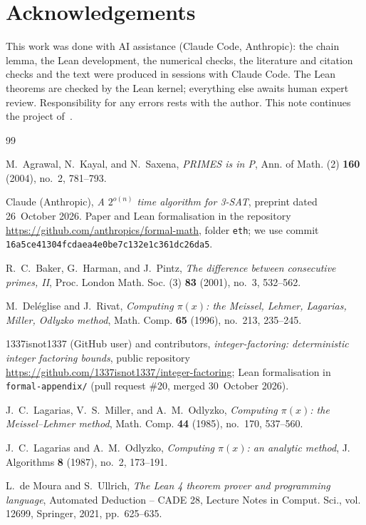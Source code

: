 \documentclass[10pt]{amsart}
\theoremstyle{plain}
\theoremstyle{definition}
\theoremstyle{remark}
\numberwithin{equation}{section}
\begin{document}
\section*{Acknowledgements}
This work was done with AI assistance (Claude Code, Anthropic): the chain lemma, the Lean development,
the numerical checks, the literature and citation checks and the text were produced in sessions with
Claude Code. The Lean theorems are checked by the Lean kernel; everything else awaits human expert
review. Responsibility for any errors rests with the author. This note continues the project
of~\cite{Tul26,TulFac26,TulCN26}.

\begin{thebibliography}{99}

M.~Agrawal, N.~Kayal, and N.~Saxena, \emph{{PRIMES} is in {P}}, Ann. of Math. (2) \textbf{160} (2004),
no.~2, 781--793.

Claude (Anthropic), \emph{A $2^{o(n)}$ time algorithm for {3-SAT}}, preprint dated 26~October 2026.
Paper and Lean formalisation in the repository \url{https://github.com/anthropics/formal-math}, folder
\texttt{eth}; we use commit \texttt{16a5ce41304fcdaea4e0be7c132e1c361dc26da5}.

R.~C.~Baker, G.~Harman, and J.~Pintz, \emph{The difference between consecutive primes, {II}}, Proc.
London Math. Soc. (3) \textbf{83} (2001), no.~3, 532--562.

M.~Del\'eglise and J.~Rivat, \emph{Computing $\pi(x)$: the {M}eissel, {L}ehmer, {L}agarias, {M}iller,
{O}dlyzko method}, Math. Comp. \textbf{65} (1996), no.~213, 235--245.

1337isnot1337 (GitHub user) and contributors, \emph{integer-factoring: deterministic integer factoring
bounds}, public repository \url{https://github.com/1337isnot1337/integer-factoring}; Lean formalisation in
\texttt{formal-appendix/} (pull request \#20, merged 30~October 2026).

J.~C.~Lagarias, V.~S.~Miller, and A.~M.~Odlyzko, \emph{Computing $\pi(x)$: the {M}eissel--{L}ehmer
method}, Math. Comp. \textbf{44} (1985), no.~170, 537--560.

J.~C.~Lagarias and A.~M.~Odlyzko, \emph{Computing $\pi(x)$: an analytic method}, J. Algorithms
\textbf{8} (1987), no.~2, 173--191.

L.~de Moura and S.~Ullrich, \emph{The {L}ean 4 theorem prover and programming language}, Automated
Deduction -- CADE 28, Lecture Notes in Comput. Sci., vol. 12699, Springer, 2021, pp.~625--635.


\end{thebibliography}
\end{document}
